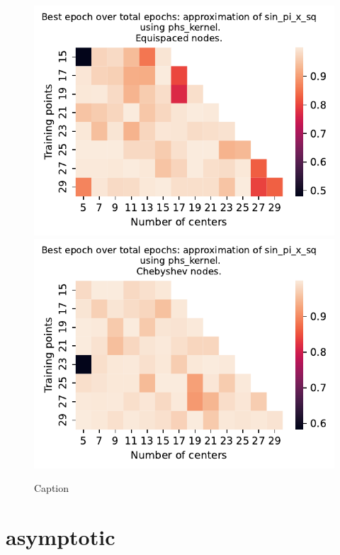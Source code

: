 \documentclass[12pt]{report} %
\begin{document}
\begin{figure}[ht]
  \centering

  \includegraphics[width=.49\textwidth]{imagenes/experiments/1d/variational_epochs/sin_pi_x_sq-Kphs_kernel-Equi-epochs.pdf}
  \includegraphics[width=.49\textwidth]{imagenes/experiments/1d/variational_epochs/sin_pi_x_sq-Kphs_kernel-Cheb-epochs.pdf}
  \caption{Caption}
  \label{fig:epochs-sin-pi-x-sq-phs}
\end{figure}

\clearpage

\section*{asymptotic}
\end{document}
